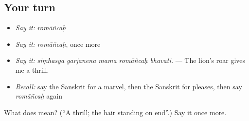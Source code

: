 \subsection*{Your turn}
\begin{itemize}
\raggedright
  \item \emph{Say it:} \emph{romāñcaḥ}
  \item \emph{Say it:} \emph{romāñcaḥ}, once more
  \item \emph{Say it:} \emph{siṃhasya garjanena mama romāñcaḥ bhavati.} — The lion's roar gives me a thrill.
  \item \emph{Recall:} say the Sanskrit for a marvel, then the Sanskrit for pleases, then say \emph{romāñcaḥ} again
\end{itemize}

\begin{tcolorbox}[breakable,colback=teal!4,colframe=teal!35!black,title={Before you move on}]
What does  mean? (\textquotedblleft{}A thrill; the hair standing on end\textquotedblright{}.) Say it once more.
\end{tcolorbox}

